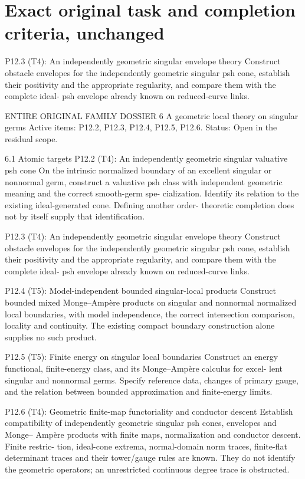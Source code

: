 \documentclass[11pt]{article}
\begin{document}
\section{Exact original task and completion criteria, unchanged}
\begin{OriginalTaskDATA}
P12.3 (T4): An independently geometric singular envelope theory
Construct obstacle envelopes for the independently geometric singular psh cone, establish
their positivity and the appropriate regularity, and compare them with the complete ideal-
psh envelope already known on reduced-curve links.

ENTIRE ORIGINAL FAMILY DOSSIER
6     A geometric local theory on singular germs
Active items: P12.2, P12.3, P12.4, P12.5, P12.6. Status: Open in the residual scope.

6.1   Atomic targets
P12.2 (T4): An independently geometric singular valuative psh cone
On the intrinsic normalized boundary of an excellent singular or nonnormal germ, construct
a valuative psh class with independent geometric meaning and the correct smooth-germ spe-
cialization. Identify its relation to the existing ideal-generated cone. Deﬁning another order-
theoretic completion does not by itself supply that identiﬁcation.

P12.3 (T4): An independently geometric singular envelope theory
Construct obstacle envelopes for the independently geometric singular psh cone, establish
their positivity and the appropriate regularity, and compare them with the complete ideal-
psh envelope already known on reduced-curve links.

P12.4 (T5): Model-independent bounded singular-local products
Construct bounded mixed Monge–Ampère products on singular and nonnormal normalized
local boundaries, with model independence, the correct intersection comparison, locality and
continuity. The existing compact boundary construction alone supplies no such product.

P12.5 (T5): Finite energy on singular local boundaries
Construct an energy functional, ﬁnite-energy class, and its Monge–Ampère calculus for excel-
lent singular and nonnormal germs. Specify reference data, changes of primary gauge, and
the relation between bounded approximation and ﬁnite-energy limits.

P12.6 (T4): Geometric ﬁnite-map functoriality and conductor descent
Establish compatibility of independently geometric singular psh cones, envelopes and Monge–
Ampère products with ﬁnite maps, normalization and conductor descent. Finite restric-
tion, ideal-cone extrema, normal-domain norm traces, ﬁnite-ﬂat determinant traces and their
tower/gauge rules are known. They do not identify the geometric operators; an unrestricted
continuous degree trace is obstructed.


\end{OriginalTaskDATA}
\end{document}
